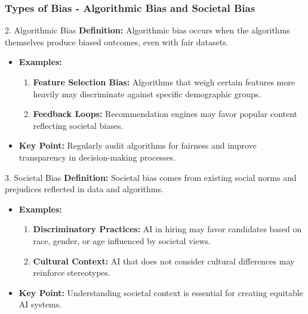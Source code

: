 \documentclass{beamer}
\begin{document}
\begin{frame}[fragile]
    \frametitle{Types of Bias - Algorithmic Bias and Societal Bias}
    \begin{block}{2. Algorithmic Bias}
        \textbf{Definition:} Algorithmic bias occurs when the algorithms themselves produce biased outcomes, even with fair datasets.

        \begin{itemize}
            \item \textbf{Examples:}
            \begin{enumerate}
                \item \textbf{Feature Selection Bias:} Algorithms that weigh certain features more heavily may discriminate against specific demographic groups.
                \item \textbf{Feedback Loops:} Recommendation engines may favor popular content reflecting societal biases.
            \end{enumerate}
            \item \textbf{Key Point:} Regularly audit algorithms for fairness and improve transparency in decision-making processes.
        \end{itemize}
    \end{block}

    \begin{block}{3. Societal Bias}
        \textbf{Definition:} Societal bias comes from existing social norms and prejudices reflected in data and algorithms.

        \begin{itemize}
            \item \textbf{Examples:}
            \begin{enumerate}
                \item \textbf{Discriminatory Practices:} AI in hiring may favor candidates based on race, gender, or age influenced by societal views.
                \item \textbf{Cultural Context:} AI that does not consider cultural differences may reinforce stereotypes.
            \end{enumerate}
            \item \textbf{Key Point:} Understanding societal context is essential for creating equitable AI systems.
        \end{itemize}
    \end{block}
\end{frame}
\end{document}
